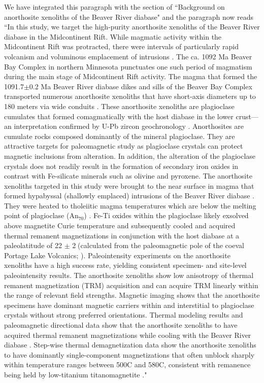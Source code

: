 \documentclass[11pt, letterpaper]{article}
\begin{document}
\begin{flushleft}
We have integrated this paragraph with the section of ``Background on anorthosite xenoliths of the Beaver River diabase" and the paragraph now reads ``In this study, we target the high-purity anorthosite xenoliths of the Beaver River diabase in the Midcontinent Rift. While magmatic activity within the Midcontinent Rift was protracted, there were intervals of particularly rapid volcanism and voluminous emplacement of intrusions \cite{Swanson-Hysell2021a}. The ca. 1092 Ma Beaver Bay Complex in northern Minnesota punctuates one such period of magmatism during the main stage of Midcontinent Rift activity. The magma that formed the 1091.7$\pm$0.2 Ma Beaver River diabase dikes and sills of the Beaver Bay Complex transported numerous anorthosite xenoliths that have short-axis diameters up to 180 meters via wide conduits \cite{Boerboom2004a, Boerboom2006b}. These anorthosite xenoliths are plagioclase cumulates that formed comagmatically with the host diabase in the lower crust---an interpretation confirmed by U-Pb zircon geochronology \cite{Zhang2021b}. Anorthosites are cumulate rocks composed dominantly of the mineral plagioclase. They are attractive targets for paleomagnetic study as plagioclase crystals can protect magnetic inclusions from alteration. In addition, the alteration of the plagioclase crystals does not readily result in the formation of secondary iron oxides in contrast with Fe-silicate minerals such as olivine and pyroxene. The anorthosite xenoliths targeted in this study were brought to the near surface in magma that formed hypabyssal (shallowly emplaced) intrusions of the Beaver River diabase \cite{Zhang2021b}. They were heated to tholeiitic magma temperatures which are below the melting point of plagioclase (An$_{70}$) \cite{Zhang2021b}. Fe-Ti oxides within the plagioclase likely exsolved above magnetite Curie temperature \cite{Bian2021a} and subsequently cooled and acquired thermal remanent magnetizations in conjunction with the host diabase at a paleolatitude of 22 $\pm$ 2\textdegree$\;$(calculated from the paleomagnetic pole of the coeval Portage Lake Volcanics; \citealp{Swanson-Hysell2019a}). Paleointensity experiments on the anorthosite xenoliths have a high success rate, yielding consistent specimen- and site-level paleointensity results. The anorthosite xenoliths show low anisotropy of thermal remanent magnetization (TRM) acquisition and can acquire TRM linearly within the range of relevant field strengths. Magnetic imaging shows that the anorthosite specimens have dominant magnetic carriers within and interstitial to plagioclase crystals without strong preferred orientations. Thermal modeling results and paleomagnetic directional data show that the anorthosite xenoliths to have acquired thermal remanent magnetizations while cooling with the Beaver River diabase \cite{Zhang2021b}. Step-wise thermal demagnetization data show the anorthosite xenoliths to have dominantly single-component magnetizations that often unblock sharply within temperature ranges between 500\textdegree C and 580\textdegree C, consistent with remanence being held by low-titanium titanomagnetite \cite{Zhang2021b}."


\end{flushleft}
\end{document}

